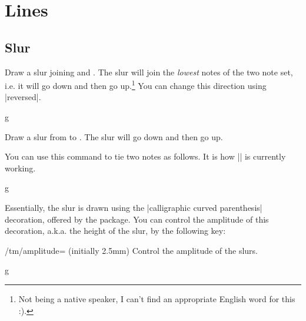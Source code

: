 \section{Lines}\label{sec:line}
\subsection{Slur}\label{sec:line:slur}
\begin{command}{\tmslur{}}
  Draw a slur joining  and . The slur will join the 
  \emph{lowest} notes of the two note set, i.e. it will go down and then go 
  up.\footnote{Not being a native speaker, I can't find an 
  appropriate English word for this :).} 
  You can change this direction using |reversed|.
\end{command}
\begin{codeexample}[]
\begin{tmline}
\begin{tmstaff}{g}{}
\end{tmstaff}
\end{tmline}
\end{codeexample}
\begin{command}{\tmslurcoordinate{}}
  Draw a slur from  to . The slur will go 
  down and then go up.
\end{command}
You can use this command to tie two notes as follows. It is how |\tmtie| is
currently working.
\begin{codeexample}[]
\begin{tmline}
\begin{tmstaff}{g}{}
\end{tmstaff}
\end{tmline}
\end{codeexample}
Essentially, the slur is drawn using the |calligraphic curved parenthesis| 
decoration, offered by the  package. You can control the amplitude of 
this decoration, a.k.a. the height of the slur, by the following key:
\begin{key}{/tm/amplitude= (initially 2.5mm)}
  Control the amplitude of the slurs.
\end{key}
\begin{codeexample}[]
\begin{tmline}
\begin{tmstaff}{g}{}
\end{tmstaff}
\end{tmline}
\end{codeexample}
